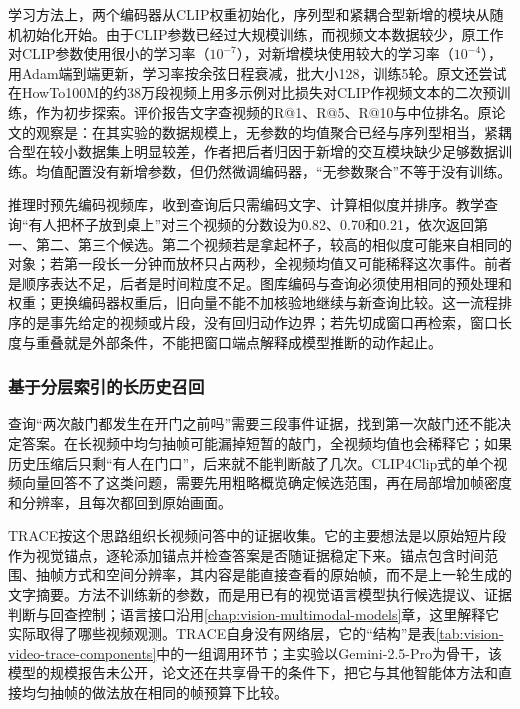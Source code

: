 学习方法上，两个编码器从CLIP权重初始化，序列型和紧耦合型新增的模块从随机初始化开始。由于CLIP参数已经过大规模训练，而视频文本数据较少，原工作对CLIP参数使用很小的学习率（$10^{-7}$），对新增模块使用较大的学习率（$10^{-4}$），用Adam端到端更新，学习率按余弦日程衰减，批大小128，训练5轮。原文还尝试在HowTo100M的约38万段视频上用多示例对比损失对CLIP作视频文本的二次预训练，作为初步探索。评价报告文字查视频的R@1、R@5、R@10与中位排名。原论文的观察是：在其实验的数据规模上，无参数的均值聚合已经与序列型相当，紧耦合型在较小数据集上明显较差，作者把后者归因于新增的交互模块缺少足够数据训练。均值配置没有新增参数，但仍然微调编码器，“无参数聚合”不等于没有训练。

推理时预先编码视频库，收到查询后只需编码文字、计算相似度并排序。教学查询“有人把杯子放到桌上”对三个视频的分数设为0.82、0.70和0.21，依次返回第一、第二、第三个候选。第二个视频若是拿起杯子，较高的相似度可能来自相同的对象；若第一段长一分钟而放杯只占两秒，全视频均值又可能稀释这次事件。前者是顺序表达不足，后者是时间粒度不足。图库编码与查询必须使用相同的预处理和权重；更换编码器权重后，旧向量不能不加核验地继续与新查询比较。这一流程排序的是事先给定的视频或片段，没有回归动作边界；若先切成窗口再检索，窗口长度与重叠就是外部条件，不能把窗口端点解释成模型推断的动作起止。

\subsubsection{基于分层索引的长历史召回}
\label{sec:vision-video-history-retrieval}

查询“两次敲门都发生在开门之前吗”需要三段事件证据，找到第一次敲门还不能决定答案。在长视频中均匀抽帧可能漏掉短暂的敲门，全视频均值也会稀释它；如果历史压缩后只剩“有人在门口”，后来就不能判断敲了几次。CLIP4Clip式的单个视频向量回答不了这类问题，需要先用粗略概览确定候选范围，再在局部增加帧密度和分辨率，且每次都回到原始画面。

TRACE按这个思路组织长视频问答中的证据收集。它的主要想法是以原始短片段作为视觉锚点，逐轮添加锚点并检查答案是否随证据稳定下来。锚点包含时间范围、抽帧方式和空间分辨率，其内容是能直接查看的原始帧，而不是上一轮生成的文字摘要。方法不训练新的参数，而是用已有的视觉语言模型执行候选提议、证据判断与回查控制；语言接口沿用\ref{chap:vision-multimodal-models}章，这里解释它实际取得了哪些视频观测。TRACE自身没有网络层，它的“结构”是表\ref{tab:vision-video-trace-components}中的一组调用环节；主实验以Gemini-2.5-Pro为骨干，该模型的规模报告未公开，论文还在共享骨干的条件下，把它与其他智能体方法和直接均匀抽帧的做法放在相同的帧预算下比较。

